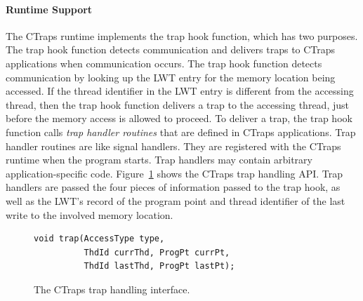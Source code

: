 \documentclass[preprint,9pt]{sigplanconf}
\newcommand{\ctraps}{CTraps\xspace}
\newcommand{\lwt}{LWT\xspace}
\begin{document}
\paragraph{Runtime Support}
The \ctraps runtime implements the trap hook function,  which has two purposes.
The trap hook function detects communication and delivers traps to \ctraps
applications when communication occurs.  The trap hook function detects
communication by looking up the \lwt entry for the memory location being
accessed.  If the thread identifier in the \lwt entry is different from the
accessing thread, then the trap hook function delivers a trap to the accessing
thread, just before the memory access is allowed to proceed.  To deliver a
trap, the trap hook function calls {\em trap handler routines} that are defined
in \ctraps applications.  Trap handler routines are like signal handlers.  They
are registered with the \ctraps runtime when the program starts.  Trap handlers
may contain arbitrary application-specific code.  Figure~\ref{fig:hookapi}
shows the \ctraps trap handling API.  Trap handlers are passed the four pieces
of information passed to the trap hook, as well as the \lwt's record of the
program point and thread identifier of the last write to the involved memory
location.

\begin{figure}[htb]
\centering
\begin{verbatim}
void trap(AccessType type, 
          ThdId currThd, ProgPt currPt,
          ThdId lastThd, ProgPt lastPt);
\end{verbatim}
\caption{\label{fig:hookapi}The \ctraps trap handling interface.}
\end{figure}
\end{document}
